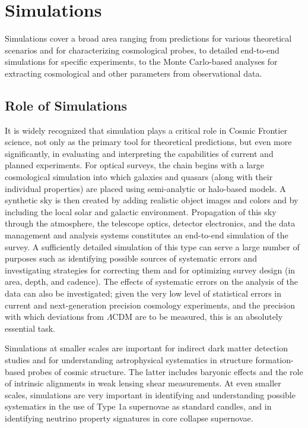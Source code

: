 \section{Simulations}

Simulations cover a broad area ranging from predictions for various
theoretical scenarios and for characterizing cosmological probes, to
detailed end-to-end simulations for specific experiments, to the Monte
Carlo-based analyses for extracting cosmological and other parameters
from observational data.

\subsection{Role of Simulations}

It is widely recognized that simulation plays a critical role in
Cosmic Frontier science, not only as the primary tool for theoretical
predictions, but even more significantly, in evaluating and
interpreting the capabilities of current and planned experiments. For
optical surveys, the chain begins with a large cosmological simulation
into which galaxies and quasars (along with their individual
properties) are placed using semi-analytic or halo-based models. A
synthetic sky is then created by adding realistic object images and
colors and by including the local solar and galactic
environment. Propagation of this sky through the atmosphere, the
telescope optics, detector electronics, and the data management and
analysis systems constitutes an end-to-end simulation of the survey. A
sufficiently detailed simulation of this type can serve a large number
of purposes such as identifying possible sources of systematic errors
and investigating strategies for correcting them and for optimizing
survey design (in area, depth, and cadence). The effects of systematic
errors on the analysis of the data can also be investigated; given the
very low level of statistical errors in current and next-generation
precision cosmology experiments, and the precision with which
deviations from $\Lambda$CDM are to be measured, this is an absolutely
essential task.

Simulations at smaller scales are important for indirect dark matter
detection studies and for understanding astrophysical systematics in
structure formation-based probes of cosmic structure. The latter
includes baryonic effects and the role of intrinsic alignments in weak
lensing shear measurements. At even smaller scales, simulations are
very important in identifying and understanding possible systematics
in the use of Type 1a supernovae as standard candles, and in
identifying neutrino property signatures in core collapse supernovae.

